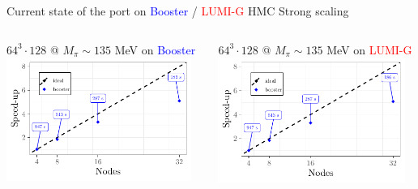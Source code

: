 \documentclass[xcolor={dvipsnames,table}]{beamer}
\begin{document}
\begin{frame}{Current state of the port on \textcolor{blue}{Booster} / \textcolor{red}{LUMI-G} }{HMC Strong scaling}
  \begin{columns}
      \begin{hpcablock}{$64^3 \cdot 128$ @ $M_\pi \sim 135$ MeV on \textcolor{blue}{Booster}}
        \includegraphics[width=0.95\textwidth, page=1]{Booster_LUMIG_HMC_Scaling}
      \end{hpcablock}
      \begin{hpcablock}{$64^3 \cdot 128$ @ $M_\pi \sim 135$ MeV on \textcolor{red}{LUMI-G}}
        \includegraphics[width=0.95\textwidth, page=2]{Booster_LUMIG_HMC_Scaling}
      \end{hpcablock}
  \end{columns}
  \vspace{0.2cm}
  \begin{columns}

\end{columns}
\end{frame}
\end{document}
